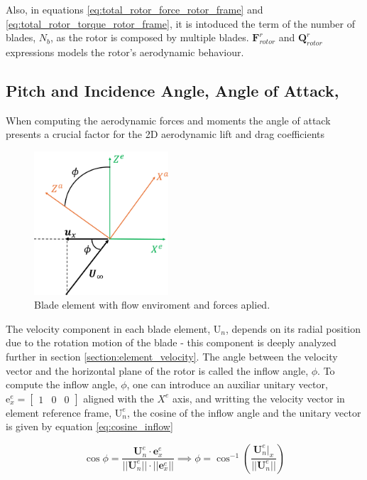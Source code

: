 Also, in equations \ref{eq:total_rotor_force_rotor_frame} and \ref{eq:total_rotor_torque_rotor_frame}, it is intoduced the term of the number of blades, $N_b$, as the rotor is composed by multiple blades. $\mathbf{F}_{rotor}^r$ and $\mathbf{Q}_{rotor}^r$ expressions models the rotor's aerodynamic behaviour.


\subsection{ Pitch and Incidence Angle, Angle of Attack,}

When computing the aerodynamic forces and moments the angle of attack presents a crucial factor for the 2D aerodynamic lift and drag coefficients

\begin{figure}[!htb]
    \centering
    \includegraphics[width=5cm]{Figures/background/bet/phi_angle.png}
    \caption{Blade element with flow enviroment and forces aplied.}
    \label{fig:phi_angle}
\end{figure}



The velocity component in each blade element, $\mathrm{U}_n$, depends on its radial position due to the rotation motion of the blade - this component is deeply analyzed further in section \ref{section:element_velocity}. The angle between the velocity vector and the horizontal plane of the rotor is called the inflow angle, $\phi$. To compute the inflow angle, $\phi$, one can introduce an auxiliar unitary vector, $\mathrm{e}^e_x = \begin{bmatrix} 1 & 0 & 0 \end{bmatrix}$ aligned with the $X^e$ axis, and writting the velocity vector in element reference frame, $\mathrm{U}_n^e$, the cosine of the inflow angle and the unitary vector is given by equation \ref{eq:cosine_inflow}



\begin{equation}
    \cos \phi = \frac{\mathbf{U}_n^e \cdot \mathbf{e}^e_x}{||\mathbf{U}_n^e|| \cdot ||\mathbf{e}_x^e||} \implies \phi = \cos^{-1} \left( \frac{\mathbf{U}_n^e|_x}{||\mathbf{U}_n^e||}\right)
    \label{eq:cosine_inflow}
\end{equation}

